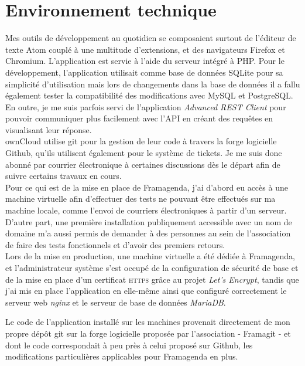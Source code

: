 \documentclass[10pt,a4paper, twoside]{report}
\begin{document}
	\section{Environnement technique}
	Mes outils de développement au quotidien se composaient surtout de l'éditeur de texte Atom couplé à une multitude d'extensions, et des navigateurs Firefox et Chromium. L'application est servie à l'aide du serveur intégré à PHP. Pour le développement, l'application utilisait comme base de données SQLite pour sa simplicité d'utilisation mais lors de changements dans la base de données il a fallu également tester la compatibilité des modifications avec MySQL et PostgreSQL.
	En outre, je me suis parfois servi de l'application \textit{Advanced REST Client} pour pouvoir communiquer plus facilement avec l'API en créant des requêtes en visualisant leur réponse.
	\\
	
	ownCloud utilise git pour la gestion de leur code à travers la forge logicielle Github, qu'ils utilisent également pour le système de tickets. Je me suis donc abonné par courrier électronique à certaines discussions dès le départ afin de suivre certains travaux en cours.
	\\
	
	Pour ce qui est de la mise en place de Framagenda, j'ai d'abord eu accès à une machine virtuelle afin d'effectuer des tests ne pouvant être effectués sur ma machine locale, comme l'envoi de courriers électroniques à partir d'un serveur. D'autre part, une première installation publiquement accessible avec un nom de domaine m'a aussi permis de demander à des personnes au sein de l'association de faire des tests fonctionnels et d'avoir des premiers retours.
	\\
	
	Lors de la mise en production, une machine virtuelle a été dédiée à Framagenda, et l'administrateur système s'est occupé de la configuration de sécurité de base et de la mise en place d'un certificat \textsc{https} grâce au projet \textit{Let's Encrypt}, tandis que j'ai mis en place l'application en elle-même ainsi que configuré correctement le serveur web \textit{nginx} et le serveur de base de données \textit{MariaDB}.
	
	Le code de l'application installé sur les machines provenait directement de mon propre dépôt git sur la forge logicielle proposée par l'association - Framagit - et dont le code correspondait à peu près à celui proposé sur Github, les modifications particulières applicables pour Framagenda en plus.
	\\
	
\end{document}
